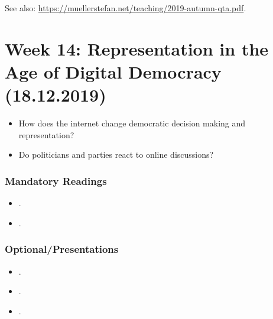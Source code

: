 \documentclass[abstract=on,parskip=full,headings=standardclasses,fontsize=11pt,paper=a4]{scrartcl}
\begin{document}
See also: \url{https://muellerstefan.net/teaching/2019-autumn-qta.pdf}.



\section{Week 14: Representation in the Age of Digital Democracy (18.12.2019)}


\begin{itemize}
\renewcommand\labelitemi{--}
\item How does the internet change democratic decision making and representation?
\item Do politicians and parties react to online discussions?
\end{itemize}

\subsubsection*{Mandatory Readings}
\begin{itemize}
\item {}.
\item {}.
\end{itemize}


\subsubsection*{Optional/Presentations}
\begin{itemize}
\item {}.
\item {}.
\item {}.
\end{itemize}

\sloppy
\renewcommand*{\bibfont}{\small}

\setlength{\bibitemsep}{0.2em} %

\bigskip

\end{document}
